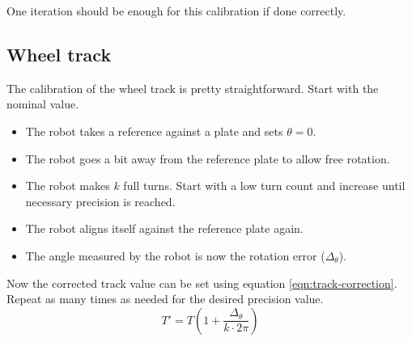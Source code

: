 \documentclass[a4paper]{IEEEtran}
\begin{document}
One iteration should be enough for this calibration if done correctly.



\subsection{Wheel track}
The calibration of the wheel track is pretty straightforward.
Start with the nominal value.
\begin{itemize}
    \item The robot takes a reference against a plate and sets $\theta = 0$.
    \item The robot goes a bit away from the reference plate to allow free rotation.
    \item The robot makes $k$ full turns.
        Start with a low turn count and increase until necessary precision is reached.
    \item The robot aligns itself against the reference plate again.
    \item The angle measured by the robot is now the rotation error ($\Delta_\theta$).
\end{itemize}
Now the corrected track value can be set using equation \ref{eqn:track-correction}.
Repeat as many times as needed for the desired precision value.
\begin{equation}
    T' = T \left(1 + \frac{\Delta_\theta}{k \cdot 2\pi}\right)
    \label{eqn:track-correction}
\end{equation}
\end{document}
